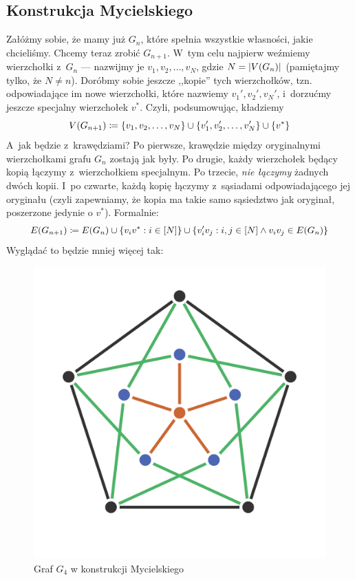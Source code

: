 \subsection{Konstrukcja Mycielskiego}
Załóżmy sobie, że mamy już $G_n$, które spełnia wszystkie własności, jakie chcieliśmy. Chcemy teraz zrobić $G_{n + 1}$. W~tym celu najpierw weźmiemy wierzchołki z~$G_n$ --- nazwijmy je $v_1, v_2, \ldots, v_N$, gdzie $N = \left|V\pars{G_n}\right|$ (pamiętajmy tylko, że $N \neq n$). Doróbmy sobie jeszcze ,,kopie'' tych wierzchołków, tzn. odpowiadające im nowe wierzchołki, które nazwiemy $v_1', v_2', v_N'$, i~dorzućmy jeszcze specjalny wierzchołek $v^\ast$. Czyli, podsumowując, kładziemy
\begin{equation*}
	V\pars{G_{n + 1}} \coloneqq \left\{v_1, v_2, \ldots, v_N\right\} \cup \left\{v_1', v_2', \ldots, v_N'\right\} \cup \left\{v^\ast\right\}
\end{equation*}
A~jak będzie z~krawędziami? Po pierwsze, krawędzie między oryginalnymi wierzchołkami grafu $G_n$ zostają jak były. Po drugie, każdy wierzchołek będący kopią łączymy z~wierzchołkiem specjalnym. Po trzecie, \emph{nie łączymy} żadnych dwóch kopii. I~po czwarte, każdą kopię łączymy z~sąsiadami odpowiadającego jej oryginału (czyli zapewniamy, że kopia ma takie samo sąsiedztwo jak oryginał, poszerzone jedynie o $v^\ast$). Formalnie:
\begin{equation*}
	E\pars{G_{n + 1}} \coloneqq E\pars{G_n} \cup \left\{v_iv^\ast : i \in [N]\right\} \cup \left\{v_i'v_j : i, j \in [N] \land v_iv_j \in E\pars{G_n} \right\}
\end{equation*}
Wyglądać to będzie mniej więcej tak:

\begin{figure}[H]
	\centering
	\includegraphics[scale=0.5]{images/mycielski_graph.png}
	\caption{Graf $G_4$ w konstrukcji Mycielskiego}
\end{figure}

